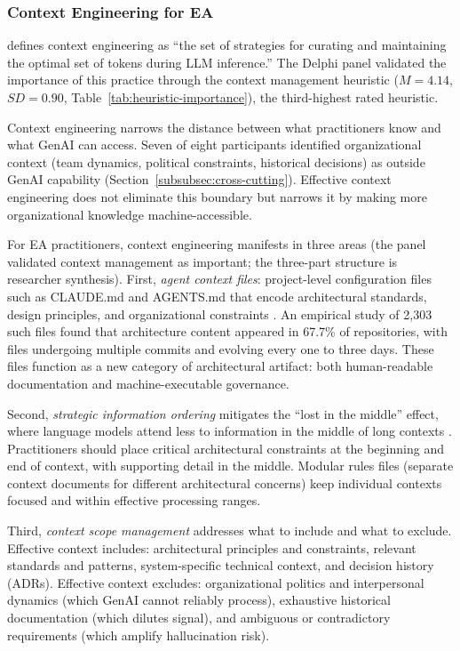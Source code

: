 \subsubsection{Context Engineering for EA}\label{subsubsec:context-engineering}

\textcite{rajasekaran_context_engineering_2025} defines context engineering as
``the set of strategies for curating and maintaining the optimal set of tokens
during LLM inference.'' The Delphi panel validated the importance of this
practice through the context management heuristic ($M = 4.14$, $SD = 0.90$,
Table~\ref{tab:heuristic-importance}), the third-highest rated heuristic.

Context engineering narrows the distance between what practitioners know and
what GenAI can access. Seven of eight participants identified organizational
context (team dynamics, political constraints, historical decisions) as
outside GenAI capability (Section~\ref{subsubsec:cross-cutting}). Effective
context engineering does not eliminate this boundary but narrows it by making
more organizational knowledge machine-accessible.

For EA practitioners, context engineering manifests in three areas (the panel
validated context management as important; the three-part structure is
researcher synthesis). First,
\textit{agent context files}: project-level configuration files such as
CLAUDE.md and AGENTS.md that encode architectural standards, design principles,
and organizational constraints
\parencite{chatlatanagulchai_agent_readmes_2025}. An empirical study of 2,303
such files found that architecture content appeared in 67.7\% of repositories,
with files undergoing multiple commits and evolving every one to three days.
These files function as a new category of architectural artifact: both
human-readable documentation and machine-executable governance.

Second, \textit{strategic information ordering} mitigates the ``lost in the
middle'' effect, where language models attend less to information in the middle
of long contexts \parencite{liu_lost_middle_2024}. Practitioners should place
critical architectural constraints at the beginning and end of context, with
supporting detail in the middle. Modular rules files (separate context documents
for different architectural concerns) keep individual contexts focused and
within effective processing ranges.

Third, \textit{context scope management} addresses what to include and what to
exclude. Effective context includes: architectural principles and constraints,
relevant standards and patterns, system-specific technical context, and
decision history (ADRs). Effective context excludes: organizational politics
and interpersonal dynamics (which GenAI cannot reliably process), exhaustive
historical documentation (which dilutes signal), and ambiguous or contradictory
requirements (which amplify hallucination risk).

